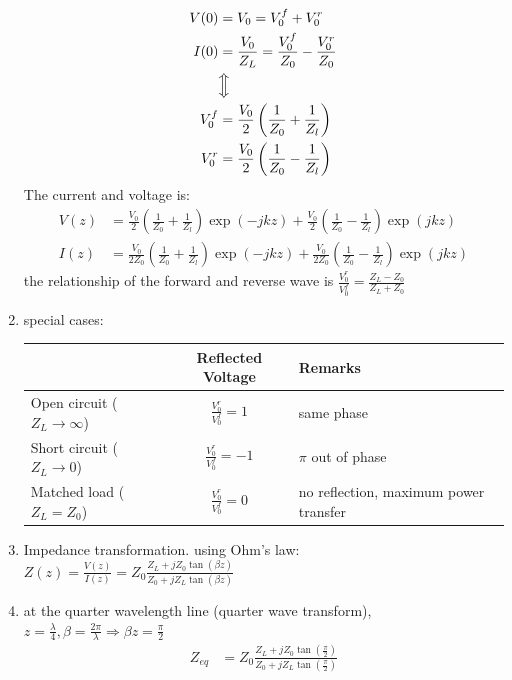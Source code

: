 \documentclass[a4paper,11pt]{article}
\begin{document}
\begin{enumerate}
		\begin{align*}
			V(0) &= V_0 = V_0^f + V_0^r \\
			I(0) &= \frac{V_0}{Z_L} = \frac{V_0^f}{Z_0} - \frac{V_0^r}{Z_0} \\
			&\Big\Updownarrow \\
			V_0^f &= \frac{V_0}{2}\left(\frac{1}{Z_0} + \frac{1}{Z_l}\right) \\ 
			V_0^r &= \frac{V_0}{2}\left(\frac{1}{Z_0} - \frac{1}{Z_l}\right) \\ 
		\end{align*} 
		The current and voltage is: 
		\begin{align*}
			V(z) &= \frac{V_0}{2}\left(\frac{1}{Z_0} + \frac{1}{Z_l}\right)\exp\left(-j k z\right) + \frac{V_0}{2}\left(\frac{1}{Z_0} - \frac{1}{Z_l}\right)\exp\left(j k z\right) \\
			I(z) &= \frac{V_0}{2Z_0}\left(\frac{1}{Z_0} + \frac{1}{Z_l}\right)\exp\left(-j k z\right) + \frac{V_0}{2Z_0}\left(\frac{1}{Z_0} - \frac{1}{Z_l}\right)\exp\left(j k z\right)
		\end{align*}
		the relationship of the forward and reverse wave is $\frac{V_0^r}{V_0^f} = \frac{Z_L - Z_0}{Z_L + Z_0}$
		\item special cases:
		\begin{center}
			\begin{tabular}{|l|c|l|}
				\hline
				& Reflected Voltage & Remarks \\ \hline
				Open circuit ($Z_L \to \infty$) & $\frac{V_0^r}{V_0^f} = 1$ & same phase \\ \hline 
				Short circuit ($Z_L \to 0$) & $\frac{V_0^r}{V_0^f} = -1$ & $\pi$ out of phase \\ \hline 
				Matched load ($Z_L = Z_0$) & $\frac{V_0^r}{V_0^f} = 0$ & no reflection, maximum power transfer\\ \hline 
			\end{tabular}
		\end{center}
		\item Impedance transformation. using Ohm's law: $Z(z) = \frac{V(z)}{I(z)} = Z_0\frac{Z_L + jZ_0\tan\left(\beta z\right)}{Z_0 + jZ_L\tan\left(\beta z\right)}$
		\item at the quarter wavelength line (quarter wave transform), $z = \frac{\lambda}{4}, \beta = \frac{2\pi}{\lambda} \Longrightarrow\beta z = \frac{\pi}{2}$
		\begin{align*}
			Z_{eq} &= Z_0\frac{Z_L + jZ_0\tan\left(\frac{\pi}{2}\right)}{Z_0 + jZ_L\tan\left(\frac{\pi}{2}\right)} \\

\end{align*}
\end{enumerate}
\end{document}
